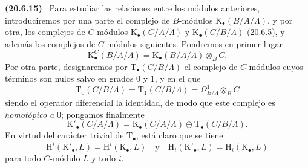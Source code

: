 \documentclass[10pt,oneside]{book}
\makeatletter
\newcommand{\setmanualcurrentlabel}[1]{\def\@currentlabel{#1}}
\newcommand{\oldpage}[2][]{%
  \setcounter{footnote}{0}%
  \marginpar{\scriptsize\textbf{#1}~|~#2}\ignorespaces}
\newenvironment{env}[1][]{\setmanualcurrentlabel{#1}\par\medskip\noindent\textbf{(#1)}\ }{\par}
\makeatother
\begin{document}
\begin{env}[20.6.15]
\label{0.20.6.15-es}
Para estudiar las relaciones entre los módulos anteriores, introduciremos
por una parte el complejo de $B$-módulos
$\mathrm{K}_\bullet(B/A/\Lambda)$, y por otra, los complejos
\oldpage[0\textsubscript{IV-1}]{142}
de $C$-módulos $\mathrm{K}_\bullet(C/A/\Lambda)$ y
$\mathrm{K}_\bullet(C/B/\Lambda)$ (20.6.5), y además los complejos de
$C$-módulos siguientes. Pondremos en primer lugar
\begin{equation}
\tag{20.6.15.1}
\label{0.20.6.15.1-es}
  \mathrm{K}^C_\bullet(B/A/\Lambda)=
  \mathrm{K}_\bullet(B/A/\Lambda)\otimes_B C.
\end{equation}
Por otra parte, designaremos por $\mathrm{T}_\bullet(C/B/\Lambda)$ el
complejo de $C$-módulos cuyos términos son nulos salvo en grados 0 y 1,
y en el que
\begin{equation}
\tag{20.6.15.2}
\label{0.20.6.15.2-es}
  \mathrm{T}_0(C/B/\Lambda)=\mathrm{T}_1(C/B/\Lambda)=
  \Omega^1_{B/\Lambda}\otimes_B C
\end{equation}
siendo el operador diferencial la identidad, de modo que este complejo es
\emph{homotópico a} 0; pongamos finalmente
\begin{equation}
\tag{20.6.15.3}
\label{0.20.6.15.3-es}
  \mathrm{K}'_\bullet(C/A/\Lambda)=
  \mathrm{K}_\bullet(C/A/\Lambda)\oplus
  \mathrm{T}_\bullet(C/B/\Lambda).
\end{equation}
En virtud del carácter trivial de $\mathrm{T}_\bullet$, está claro que
se tiene
\begin{equation}
\tag{20.6.15.4}
\label{0.20.6.15.4-es}
  \mathrm{H}^i(\mathrm{K}'_\bullet,L)=
  \mathrm{H}^i(\mathrm{K}_\bullet,L)
  \quad\text{y}\quad
  \mathrm{H}_i(\mathrm{K}'_\bullet,L)=
  \mathrm{H}_i(\mathrm{K}_\bullet,L)
\end{equation}
para todo $C$-módulo $L$ y todo $i$.
\end{env}
\end{document}
